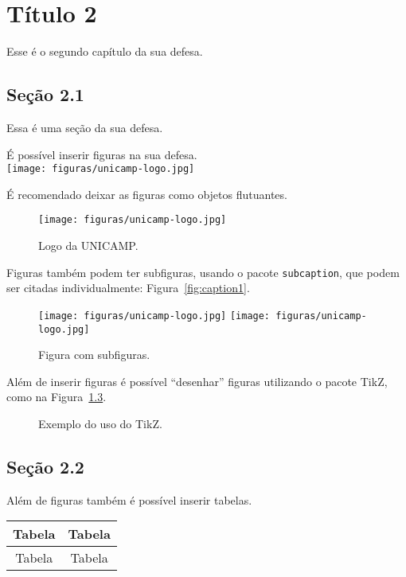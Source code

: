 \chapter{Título 2}
Esse é o segundo capítulo da sua defesa.

\section{Seção 2.1}
Essa é uma seção da sua defesa.

É possível inserir figuras na sua defesa. \\
\texttt{[image: figuras/unicamp-logo.jpg]}

É recomendado deixar as figuras como objetos flutuantes.
\begin{figure}[!htb]
  \center
  \texttt{[image: figuras/unicamp-logo.jpg]}
  \caption{Logo da UNICAMP.}
  \label{fig:log_unicamp}
\end{figure}

Figuras também podem ter subfiguras, usando o pacote \texttt{subcaption}, que 
podem ser citadas individualmente: Figura~\ref{fig:caption1}.
\begin{figure}[!htb]
  \centering
  {\texttt{[image: figuras/unicamp-logo.jpg]}}
  \qquad
  {\texttt{[image: figuras/unicamp-logo.jpg]}}
  \caption{Figura com subfiguras.}
  \label{fig:subfig}
\end{figure}

Além de inserir figuras é possível ``desenhar'' figuras
utilizando o pacote TikZ, como na Figura~\ref{fig:exem_tikz}.
\begin{figure}[!htb]
  \centering
  \caption{Exemplo do uso do TikZ.}
  \label{fig:exem_tikz}
\end{figure}

\section{Seção 2.2}
Além de figuras também é possível inserir tabelas. \\
\begin{tabular}{cc}
  \toprule
  Tabela & Tabela \\
  \midrule
  Tabela & Tabela \\
  \bottomrule
\end{tabular}

